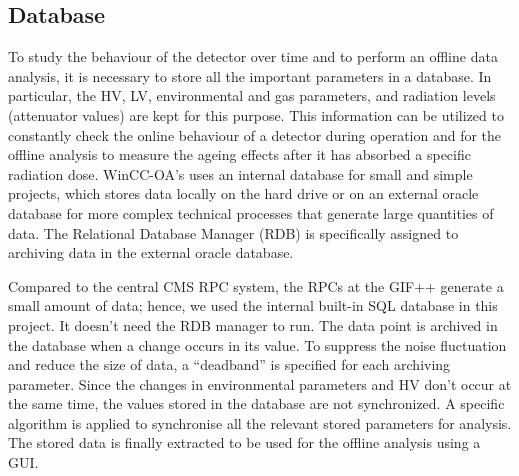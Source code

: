 \subsection{Database}
To study the behaviour of the detector over time and to perform an offline data analysis, it is necessary to store all the important parameters in a database. In particular, the HV, LV, environmental and gas parameters, and radiation levels (attenuator values) are kept for this purpose. This information can be utilized to constantly check the online behaviour of a detector during operation and for the offline analysis to measure the ageing effects after it has absorbed a specific radiation dose. WinCC-OA's uses an internal database for small and simple projects, which stores data locally on the hard drive or on an external oracle database for more complex technical processes that generate large quantities of data. The Relational Database Manager (RDB) is specifically assigned to archiving data in the external oracle database. 

Compared to the central CMS RPC system, the RPCs at the GIF++ generate a small amount of data; hence, we used the internal built-in SQL database in this project. It doesn't need the RDB manager to run. The data point is archived in the database when a change occurs in its value. To suppress the noise fluctuation and reduce the size of data, a ``deadband'' is specified for each archiving parameter. Since the changes in environmental parameters and HV don't occur at the same time, the values stored in the database are not synchronized. A specific algorithm is applied to synchronise all the relevant stored parameters for analysis. The stored data is finally extracted to be used for the offline analysis using a GUI.


